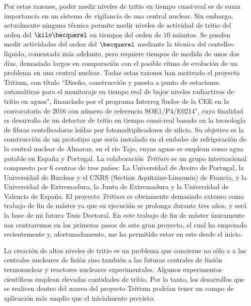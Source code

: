 Por estas razones, poder medir niveles de tritio en tiempo cuasi-real es de suma importancia en un sistema de vigilancia de una central nuclear. Sin embargo, actualmente ninguna técnica permite medir niveles de actividad de tritio del orden del $\kilo\becquerel$ en tiempos del orden de $10$ minutos.   Se pueden medir actividades  del orden del $\becquerel$  mediante la técnica del centelleo líquido, comentada más adelante, pero requiere tiempos de medida de unos dos días, demasiado largos en comparación con el posible ritmo de evolución de un problema en una central nuclear.   Todas estas razones han motivado el proyecto Tritium, con título ``Diseño, construcción y puesta a punto de estaciones automáticas para el monitoraje en tiempo real de bajos niveles radiactivos de tritio en aguas",  financiado por el programa Interreg Sudoe de la CEE en la convocatoria de 2016 con número de referencia  SOE1/P4/E0214", cuya finalidad es desarrollo de un detector de tritio en tiempo cuasi-real basado en la tecnología de fibras centelleadoras leídas por fotomultiplicadores de silicio. Su objetivo es la construcción de un prototipo que sería instalado en el embalse de refrigeración de la central nuclear de Almaraz, en el río Tajo, cuyas aguas se emplean como agua potable en España y Portugal.
La colaboración \textit{Tritium} es un grupo internacional compuesto por 6 centros de tres países:  La Universidad de Aveiro de Portugal,  la Universidad de Burdeos y el CNRS (Section Aquitaine-Limousin)  de Francia,  y  la Universidad de Extremadura, la Junta de Extremadura y la Universidad de Valencia de España. El proyecto \textit{Tritium} es  obviamente demasiado extenso como trabajo de fin de máster ya que  su ejecución se prolonga durante tres  años, y será la base de mi futura Tesis Doctoral. En este trabajo de fin de máster únicamente nos centraremos en los primeros pasos de este gran proyecto, el cual ha empezado recientemente y, afortunadamente, me ha permitido estar en este desde el inicio.









La creación de altos niveles de tritio es un problema que concierne no sólo a  a las  centrales nucleares de fisión sino también a las  futuras centrales de fusión termonuclear y reactores nucleares experimentales. Algunos experimentos científicos emplean elevadas cantidades de tritio. Por lo tanto, los desarrollos que se realicen dentro del marco del proyecto Tritium podrían tener un campo de aplicación más amplio que el inicialmente previsto.


